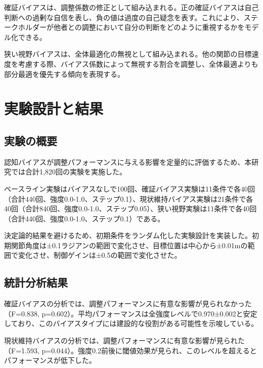 確証バイアスは、調整係数の修正として組み込まれる。正の確証バイアスは自己判断への過剰な自信を表し、負の値は過度の自己疑念を表す。これにより、ステークホルダーが他者との調整において自分の判断をどのように重視するかをモデル化できる。

狭い視野バイアスは、全体最適化の無視として組み込まれる。他の関節の目標速度を考慮する際、バイアス係数によって無視する割合を調整し、全体最適よりも部分最適を優先する傾向を表現する。

\section{実験設計と結果}
\label{sec:ch4_experiment}

\subsection{実験の概要}

認知バイアスが調整パフォーマンスに与える影響を定量的に評価するため、本研究では合計1,820回の実験を実施した。

ベースライン実験はバイアスなしで100回、確証バイアス実験は11条件で各40回（合計440回、強度0.0-1.0、ステップ0.1）、現状維持バイアス実験は21条件で各40回（合計840回、強度0.0-1.0、ステップ0.05）、狭い視野実験は11条件で各40回（合計440回、強度0.0-1.0、ステップ0.1）である。

決定論的結果を避けるため、初期条件をランダム化した実験設計を実装した。初期関節角度は±0.1ラジアンの範囲で変化させ、目標位置は中心から±0.01mの範囲で変化させ、制御ゲインは±0.5の範囲で変化させた。

\subsection{統計分析結果}

確証バイアスの分析では、調整パフォーマンスに有意な影響が見られなかった（F=0.838, p=0.602）。平均パフォーマンスは全強度レベルで0.970±0.002と安定しており、このバイアスタイプには建設的な役割がある可能性を示唆している。

現状維持バイアスの分析では、調整パフォーマンスに有意な影響が見られた（F=1.593, p=0.044）。強度0.2前後に閾値効果が見られ、このレベルを超えるとパフォーマンスが低下した。

